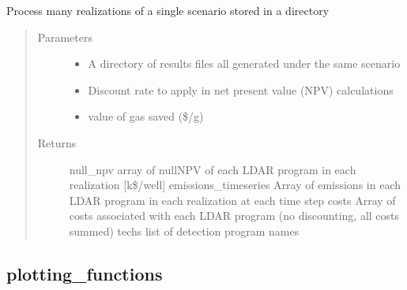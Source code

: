 \documentclass[letterpaper,10pt,english]{sphinxmanual}
\begin{document}
\begin{fulllineitems}
\label{\detokenize{index:feast.ResultsProcessing.results_analysis_functions.results_analysis_json}}
Process many realizations of a single scenario stored in a directory
\begin{quote}\begin{description}
\item[{Parameters}] \leavevmode\begin{itemize}
\item {} 
 \textendash{} A directory of results files all generated under the same scenario

\item {} 
 \textendash{} Discount rate to apply in net present value (NPV) calculations

\item {} 
 \textendash{} value of gas saved (\$/g)

\end{itemize}

\item[{Returns}] \leavevmode
null\_npv          array of null\sphinxhyphen{}NPV of each LDAR program in each realization {[}k\$/well{]}
emissions\_timeseries  Array of emissions in each LDAR program in each realization at each time step
costs                 Array of costs associated with each LDAR program (no discounting, all costs summed)
techs           list of detection program names

\end{description}\end{quote}

\end{fulllineitems}



\subsection{plotting\_functions}
\label{\detokenize{index:module-feast.ResultsProcessing.plotting_functions}}\label{\detokenize{index:plotting-functions}}
\end{document}
